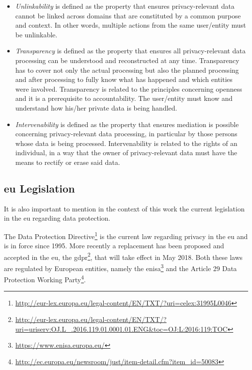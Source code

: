 \begin{itemize}

\item \textit{Unlinkability} is defined as the property that ensures privacy-relevant data cannot be linked across domains that are constituted by a common purpose and context. In other words, multiple actions from the same user/entity must be unlinkable.

\item \textit{Transparency} is defined as the property that ensures all privacy-relevant data processing can be understood and reconstructed at any time. Transparency has to cover not only the actual processing but also the planned processing and after processing to fully know what has happened and which entities were involved. Transparency is related to the principles concerning openness and it is a prerequisite to accountability. The user/entity must know and understand how his/her private data is being handled.

\item \textit{Intervenability} is defined as the property that ensures mediation is possible concerning privacy-relevant data processing, in particular by those persons whose data is being processed. Intervenability is related to the rights of an individual, in a way that the owner of privacy-relevant data must have the means to rectify or erase said data.

\end{itemize}


\subsection{\acl{eu} Legislation}
\label{ssec:EuropeanUnionLegislation}

It is also important to mention in the context of this work the current legislation in the \ac{eu} regarding data protection.

 The Data Protection Directive\footnote{\url{http://eur-lex.europa.eu/legal-content/EN/TXT/?uri=celex:31995L0046}} is the current law regarding privacy in the \ac{eu} and is in force since 1995.
More recently a replacement has been proposed and accepted in the \ac{eu}, the \ac{gdpr}\footnote{\url{http://eur-lex.europa.eu/legal-content/EN/TXT/?uri=uriserv:OJ.L_.2016.119.01.0001.01.ENG&toc=OJ:L:2016:119:TOC}}, that will take effect in May 2018. Both these laws are regulated by European entities, namely the \ac{enisa}\footnote{\url{https://www.enisa.europa.eu/}} and the Article 29 Data Protection Working Party\footnote{\url{http://ec.europa.eu/newsroom/just/item-detail.cfm?item_id=50083}}.


